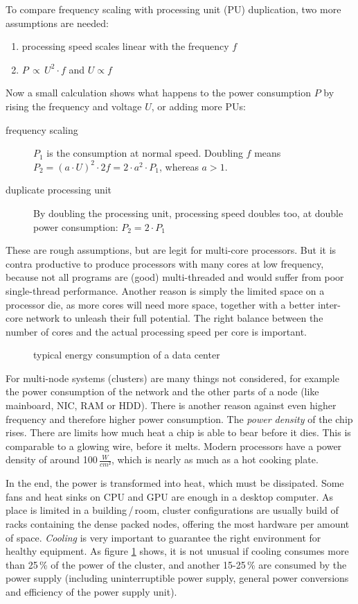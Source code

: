 \newpage
To compare frequency scaling with processing unit (PU) duplication, two more assumptions are needed: 
%
\begin{enumerate}
\item processing speed scales linear with the frequency $f$
\item $P \,\propto \,U^2 \cdot f$ and $U \propto f$
\end{enumerate}
%
Now a small calculation shows what happens to the power consumption $P$ by rising the frequency and voltage $U$, or adding more PUs:
%
\begin{description}
\item[frequency scaling] $P_1$ is the consumption at normal speed. Doubling $f$ means $P_2 = (a \cdot U)^2 \cdot 2 f = 2 \cdot a^2 \cdot P_1$, whereas $a > 1$.
\item[duplicate processing unit] By doubling the processing unit, processing speed doubles too, at double power consumption: $P_2 = 2 \cdot P_1$
\end{description}
%
These are rough assumptions, but are legit for multi-core processors. But it is contra productive to produce processors with many cores at low frequency, because not all programs are (good) multi-threaded and would suffer from poor single-thread performance. Another reason is simply the limited space on a processor die, as more cores will need more space, together with a better inter-core network to unleash their full potential. The right balance between the number of cores and the actual processing speed per core is important.
%
\begin{figure}
	\centering
	
\newcommand*\Captiontext{typical energy consumption of a data center}
	\caption[\Captiontext]{\Captiontext\cite{cooling}}
	\label{fig:coolingpie}
\end{figure}
%

For multi-node systems (clusters) are many things not considered, for example the power consumption of the network and the other parts of a node (like mainboard, NIC, RAM or HDD). There is another reason against even higher frequency and therefore higher power consumption. The \emph{power density} %
 of the chip rises. There are limits how much heat a chip is able to bear before it dies. This is comparable to a glowing wire, before it melts. Modern processors have a power density of around 100\,$\frac{W}{cm²}$, which is nearly as much as a hot cooking plate.

In the end, the power is transformed into heat, which must be dissipated. Some fans and heat sinks on CPU and GPU are enough in a desktop computer. As place is limited in a building\,/\,room, cluster configurations are usually build of racks containing the dense packed nodes, offering the most hardware per amount of space. \emph{Cooling} is very important to guarantee the right environment for healthy equipment. As figure \ref{fig:coolingpie} shows, it is not unusual if cooling consumes more than 25\,\% of the power of the cluster, and another 15-25\,\% are consumed by the power supply (including uninterruptible power supply, general power conversions and efficiency of the power supply unit).

